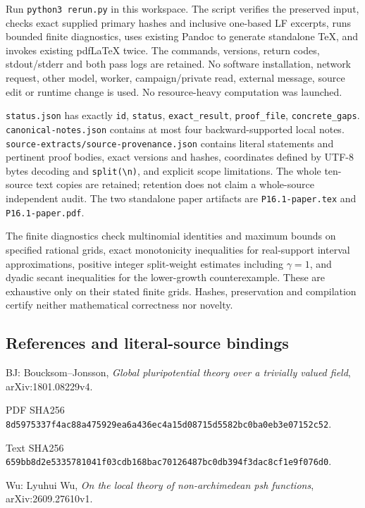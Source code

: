 \documentclass[
  10pt,
]{article}
\begin{document}
Run \texttt{python3\ rerun.py} in this workspace. The script verifies
the preserved input, checks exact supplied primary hashes and inclusive
one-based LF excerpts, runs bounded finite diagnostics, uses existing
Pandoc to generate standalone TeX, and invokes existing pdfLaTeX twice.
The commands, versions, return codes, stdout/stderr and both pass logs
are retained. No software installation, network request, other model,
worker, campaign/private read, external message, source edit or runtime
change is used. No resource-heavy computation was launched.

\texttt{status.json} has exactly \texttt{id}, \texttt{status},
\texttt{exact\_result}, \texttt{proof\_file}, \texttt{concrete\_gaps}.
\texttt{canonical-notes.json} contains at most four backward-supported
local notes. \texttt{source-extracts/source-provenance.json} contains
literal statements and pertinent proof bodies, exact versions and
hashes, coordinates defined by UTF-8 bytes decoding and
\texttt{split(\textquotesingle{}\textbackslash{}n\textquotesingle{})},
and explicit scope limitations. The whole ten-source text copies are
retained; retention does not claim a whole-source independent audit. The
two standalone paper artifacts are \texttt{P16.1-paper.tex} and
\texttt{P16.1-paper.pdf}.

The finite diagnostics check multinomial identities and maximum bounds
on specified rational grids, exact monotonicity inequalities for
real-support interval approximations, positive integer split-weight
estimates including \(\gamma=1\), and dyadic secant inequalities for the
lower-growth counterexample. These are exhaustive only on their stated
finite grids. Hashes, preservation and compilation certify neither
mathematical correctness nor novelty.

\subsection{References and literal-source
bindings}\label{references-and-literal-source-bindings}

BJ: Boucksom--Jonsson, \emph{Global pluripotential theory over a
trivially valued field}, arXiv:1801.08229v4.

PDF SHA256
\texttt{8d5975337f4ac88a475929ea6a436ec4a15d08715d5582bc0ba0eb3e07152c52}.

Text SHA256
\texttt{659bb8d2e5335781041f03cdb168bac70126487bc0db394f3dac8cf1e9f076d0}.

Wu: Lyuhui Wu, \emph{On the local theory of non-archimedean psh
functions}, arXiv:2609.27610v1.
\end{document}
